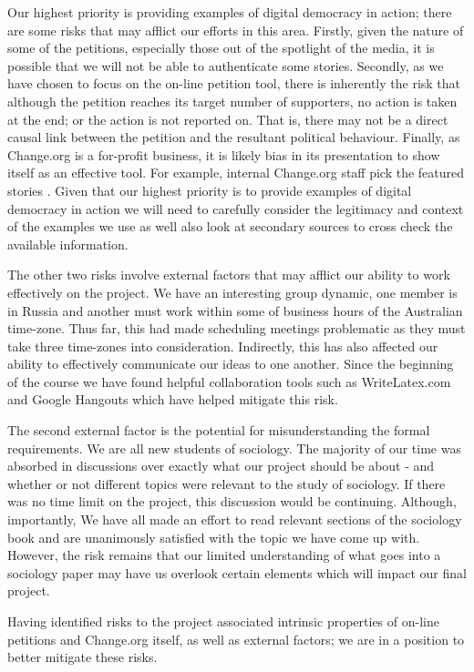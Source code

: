 Our highest priority is providing examples of digital democracy in action; there are some risks that may afflict our efforts in this area. Firstly, given the nature of some of the petitions, especially those out of the spotlight of the media, it is possible that we will not be able to authenticate some stories. Secondly, as we have chosen to focus on the on-line petition tool, there is inherently the risk that although the petition reaches its target number of supporters, no action is taken at the end; or the action is not reported on. That is, there may not be a direct causal link between the petition and the resultant political behaviour. Finally, as Change.org is a for-profit business, it is likely bias in its presentation to show itself as an effective tool. For example, internal Change.org staff pick the featured stories \citep{ForbesChange}. Given that our highest priority is to provide examples of digital democracy in action we will need to carefully consider the legitimacy and context of the examples we use as well also look at secondary sources to cross check the available information.\par
\vspace{0.2cm}
The other two risks involve external factors that may afflict our ability to work effectively on the project. We have an interesting group dynamic, one member is in Russia and another must work within some of business hours of the Australian time-zone. Thus far, this had made scheduling meetings problematic as they must take three time-zones into consideration. Indirectly, this has also affected our ability to effectively communicate our ideas to one another. Since the beginning of the course we have found helpful collaboration tools such as WriteLatex.com and Google Hangouts which have helped mitigate this risk.\par
\vspace{0.2cm}
The second external factor is the potential for misunderstanding the formal requirements. We are all new students of sociology. The majority of our time was absorbed in discussions over exactly what our project should be about - and whether or not different topics were relevant to the study of sociology. If there was no time limit on the project, this discussion would be continuing. Although, importantly, We have all made an effort to read relevant sections of the sociology book and are unanimously satisfied with the topic we have come up with. However, the risk remains that our limited understanding of what goes into a sociology paper may have us overlook certain elements which will impact our final project.\par
\vspace{0.2cm}
Having identified risks to the project associated intrinsic properties of on-line petitions and Change.org itself, as well as external factors; we are in a position to better mitigate these risks.

